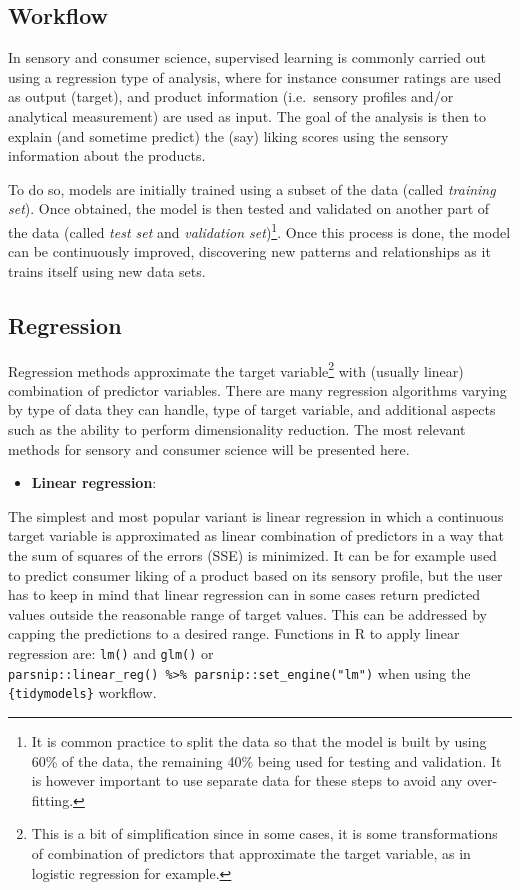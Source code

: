 \documentclass[
]{krantz}
\providecommand{\tightlist}{%
  \setlength{\itemsep}{0pt}\setlength{\parskip}{0pt}}
\begin{document}
\hypertarget{workflow}{%
\subsection{Workflow}\label{workflow}}

In sensory and consumer science, supervised learning is commonly carried out using a regression type of analysis, where for instance consumer ratings are used as output (target), and product information (i.e.~sensory profiles and/or analytical measurement) are used as input. The goal of the analysis is then to explain (and sometime predict) the (say) liking scores using the sensory information about the products.

To do so, models are initially trained using a subset of the data (called \emph{training set}). Once obtained, the model is then tested and validated on another part of the data (called \emph{test set} and \emph{validation set})\footnote{It is common practice to split the data so that the model is built by using 60\% of the data, the remaining 40\% being used for testing and validation. It is however important to use separate data for these steps to avoid any over-fitting.}. Once this process is done, the model can be continuously improved, discovering new patterns and relationships as it trains itself using new data sets.

\hypertarget{regression}{%
\subsection{Regression}\label{regression}}

Regression methods approximate the target variable\footnote{This is a bit of simplification since in some cases, it is some transformations of combination of predictors that approximate the target variable, as in logistic regression for example.} with (usually linear) combination of predictor variables. There are many regression algorithms varying by type of data they can handle, type of target variable, and additional aspects such as the ability to perform dimensionality reduction. The most relevant methods for sensory and consumer science will be presented here.

\begin{itemize}
\tightlist
\item
  \textbf{Linear regression}:
\end{itemize}

The simplest and most popular variant is linear regression in which a continuous target variable is approximated as linear combination of predictors in a way that the sum of squares of the errors (SSE) is minimized. It can be for example used to predict consumer liking of a product based on its sensory profile, but the user has to keep in mind that linear regression can in some cases return predicted values outside the reasonable range of target values. This can be addressed by capping the predictions to a desired range. Functions in R to apply linear regression are: \texttt{lm()} and \texttt{glm()} or \texttt{parsnip::linear\_reg()\ \%\textgreater{}\%\ parsnip::set\_engine("lm")} when using the \texttt{\{tidymodels\}} workflow.
\end{document}

